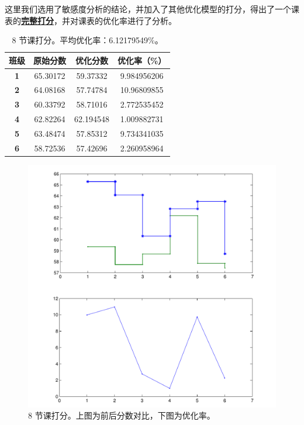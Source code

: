 \documentclass[a4paper]{article}
\begin{document}
   这里我们选用了敏感度分析的结论，并加入了其他优化模型的打分，得出了一个课表的\hyperlink{program}{\textbf{完整打分}}，并对课表的优化率进行了分析。

   \begin{table}[H]
   \centering
   \begin{tabular}{cccc}
   \toprule
   \bf 班级 & \bf 原始分数 & \bf 优化分数 & \bf 优化率（\%）\\
   \midrule
   \bf 1 & 65.30172 & 59.37332 & 9.984956206 \\
   \bf 2 & 64.08168 & 57.74784 & 10.96809855 \\
   \bf 3 & 60.33792 & 58.71016 & 2.772535452 \\
   \bf 4 & 62.82264 & 62.194548 & 1.009882731 \\
   \bf 5 & 63.48474 & 57.85312 & 9.734341035 \\
   \bf 6 & 58.72536 & 57.42696 & 2.260958964 \\
   \bottomrule
   \end{tabular}
   \caption{8 节课打分。平均优化率：6.12179549\%。}
   \end{table}

   \begin{figure}[H]
   \centerline{\includegraphics[scale=0.7]{8lessons.pdf}}
   \caption{8 节课打分。上图为前后分数对比，下图为优化率。}
   \end{figure}
\end{document}
